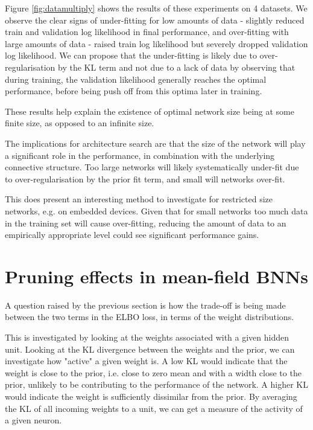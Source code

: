 Figure \ref{fig:datamultiply} shows the results of these experiments on 4 datasets. We observe the clear signs of under-fitting for low amounts of data - slightly reduced train and validation log likelihood in final performance, and over-fitting with large amounts of data - raised train log likelihood but severely dropped validation log likelihood. We can propose that the under-fitting is likely due to over-regularisation by the KL term and not due to a lack of data by observing that during training, the validation likelihood generally reaches the optimal performance, before being push off from this optima later in training. 

These results help explain the existence of optimal network size being at some finite size, as opposed to an infinite size.

The implications for architecture search are that the size of the network will play a significant role in the performance, in combination with the underlying connective structure. Too large networks will likely systematically under-fit due to over-regularisation by the prior fit term, and small will networks over-fit. 

This does present an interesting method to investigate for restricted size networks, e.g. on embedded devices. Given that for small networks too much data in the training set will cause over-fitting, reducing the amount of data to an empirically appropriate level could see significant performance gains.

\section{Pruning effects in mean-field BNNs}
\label{sec:pruning}

A question raised by the previous section is how the trade-off is being made between the two terms in the ELBO loss, in terms of the weight distributions.

This is investigated by looking at the weights associated with a given hidden unit. Looking at the KL divergence between the weights and the prior, we can investigate how "active" a given weight is. A low KL would indicate that the weight is close to the prior, i.e. close to zero mean and with a width close to the prior, unlikely to be contributing to the performance of the network. A higher KL would indicate the weight is sufficiently dissimilar from the prior. By averaging the KL of all incoming weights to a unit, we can get a measure of the activity of a given neuron. 

